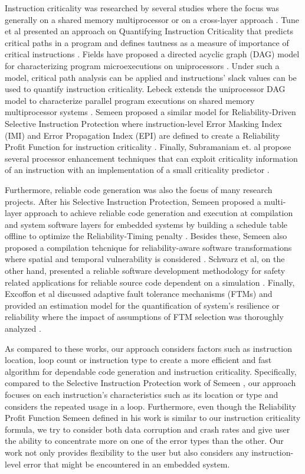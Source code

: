 Instruction criticality was researched by several studies where the focus was generally on a shared memory multiprocessor \cite{Lebeck:2003} or on a cross-layer approach \cite{Rehman:2016}. Tune et al presented an approach on Quantifying Instruction Criticality that predicts critical paths in a program and defines tautness as a measure of importance of critical instructions \cite{Tune:2002}. Fields have proposed a directed acyclic graph (DAG) model for characterizing program microexecutions on uniprocessors \cite{Fields:2001}. Under such a model, critical path analysis can be applied and instructions' slack values can be used to quantify instruction criticality. Lebeck extends the uniprocessor DAG model to characterize parallel program executions on shared memory multiprocessor systems \cite{Lebeck:2003}. Semeen proposed a similar model for Reliability-Driven Selective Instruction Protection where instruction-level Error Masking Index (IMI) and Error Propagation Index (EPI) are defined to create a Reliability Profit Function for instruction criticality \cite{Rehman:2016}. Finally, Subramaniam et. al propose several processor enhancement techniques that can exploit criticality information of an instruction with an implementation of a small criticality predictor \cite{Subramaniam:2009}. 


 Furthermore, reliable code generation was also the focus of many research projects. After his Selective Instruction Protection, Semeen proposed a multi-layer approach to achieve reliable code generation and execution at compilation and system software layers for embedded systems by building a schedule table offline to optimize the Reliability-Timing penalty \cite{RTPenalty:2013}. Besides these, Semeen also proposed a compilation tehcnique for reliability-aware software transformations where spatial and temporal vulnerability is considered \cite{Compilation_Rehman:2014}. Schwarz et al, on the other hand, presented a reliable software development methodology for safety related applications for reliable source code dependent on a simulation \cite{Schwarz:2009}. Finally, Excoffon et al discussed adaptive fault tolerance mechanisms (FTMs) and provided an estimation model for the quantification of system's resilience or reliability where the impact of assumptions of FTM selection was thoroughly analyzed \cite{FTM:2017}.

 As compared to these works, our approach considers factors such as instruction location, loop count or instruction type to create a more efficient and fast algorithm for dependable code generation and instruction criticality. Specifically, compared to the Selective Instruction Protection work of Semeen \cite{Rehman:2016}, our approach focuses on each instruction's characteristics such as its location or type and considers the repeated usage in a loop. Furthermore, even though the Reliability Profit Function Semeen defined in his work is similar to our instruction criticality formula, we try to consider both data corruption and crash rates and give user the ability to concentrate more on one of the error types than the other. Our work not only provides flexibility to the user but also considers any instruction-level error that might be encountered in an embedded system. 

